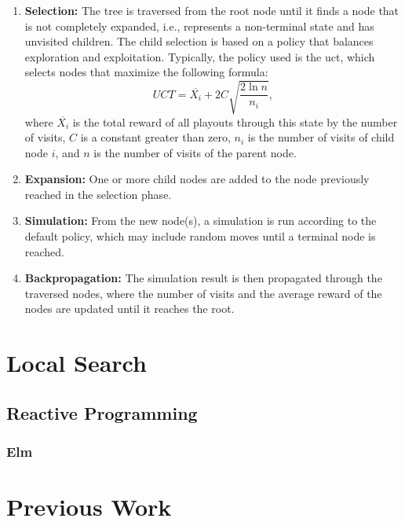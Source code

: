 \begin{enumerate}
	\item \textbf{Selection:} The tree is traversed from the root node until it finds a node that is not completely expanded, i.e., represents a non-terminal state and has unvisited children. The child selection is based on a policy that balances exploration and exploitation. Typically, the policy used is the \ac{uct}, which selects nodes that maximize the following formula: \begin{equation}UCT = \overline{X_i} + 2C\sqrt{\frac{2\ln{n}}{n_i}},\label{uct_formula}\end{equation} where \(\overline{X_i}\) is the total reward of all playouts through this state by the number of visits, \(C\) is a constant greater than zero, \(n_i\) is the number of visits of child node \(i\), and \(n\) is the number of visits of the parent node.
    \item \textbf{Expansion:} One or more child nodes are added to the node previously reached in the selection phase.
    \item \textbf{Simulation:} From the new node(s), a simulation is run according to the default policy, which may include random moves until a terminal node is reached.
    \item \textbf{Backpropagation:} The simulation result is then propagated through the traversed nodes, where the number of visits and the average reward of the nodes are updated until it reaches the root.
\end{enumerate}

\section{Local Search}

\subsection{Reactive Programming}

\subsubsection{Elm}

\section{Previous Work}


